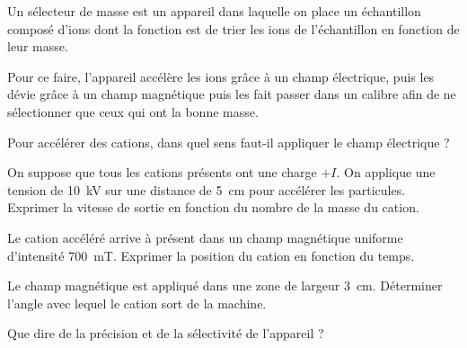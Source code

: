 

Un sélecteur de masse est un appareil dans laquelle on place un échantillon composé d'ions dont la fonction est de trier les ions de l'échantillon en fonction de leur masse.

Pour ce faire, l'appareil accélère les ions grâce à un champ électrique, puis les dévie grâce à un champ magnétique puis les fait passer dans un calibre afin de ne sélectionner que ceux qui ont la bonne masse.

\question Pour accélérer des cations, dans quel sens faut-il appliquer le champ électrique ?

\question On suppose que tous les cations présents ont une charge $+I$. On applique une tension de \SI{10}{kV} sur une distance de \SI{5}{cm} pour accélérer les particules. Exprimer la vitesse de sortie en fonction du nombre de la masse du cation.

\question Le cation accéléré arrive à présent dans un champ magnétique uniforme d'intensité \SI{700}{mT}. Exprimer la position du cation en fonction du temps.

\question Le champ magnétique est appliqué dans une zone de largeur \SI{3}{cm}. Déterminer l'angle avec lequel le cation sort de la machine.

\question Que dire de la précision et de la sélectivité de l'appareil ?
